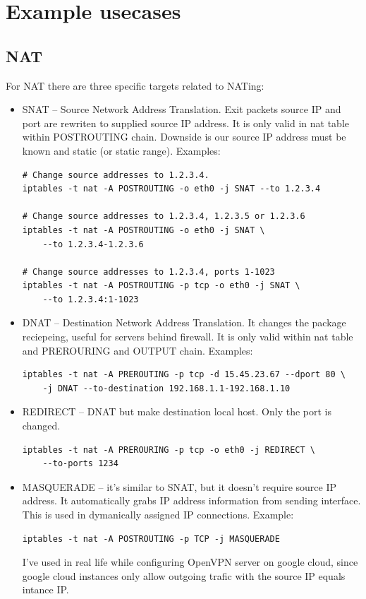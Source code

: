 \documentclass[times, utf8, seminar, english]{fer}
\begin{document}
\chapter{Example usecases}

\section{NAT}
\label{sec:NAT}

For NAT there are three specific targets related to NATing:
\begin{itemize}
    \item SNAT -- Source Network Address Translation. Exit packets source IP and port are rewriten to supplied source IP address. It is only valid in nat table within POSTROUTING chain. Downside is our source IP address must be known and static (or static range). Examples:
    \begin{verbatim}
# Change source addresses to 1.2.3.4.
iptables -t nat -A POSTROUTING -o eth0 -j SNAT --to 1.2.3.4

# Change source addresses to 1.2.3.4, 1.2.3.5 or 1.2.3.6
iptables -t nat -A POSTROUTING -o eth0 -j SNAT \
    --to 1.2.3.4-1.2.3.6

# Change source addresses to 1.2.3.4, ports 1-1023
iptables -t nat -A POSTROUTING -p tcp -o eth0 -j SNAT \
    --to 1.2.3.4:1-1023
    \end{verbatim}
    \item DNAT -- Destination Network Address Translation. It changes the package reciepeing, useful for servers behind firewall. It is only valid within nat table and PREROURING and OUTPUT chain. Examples:
    \begin{verbatim}
iptables -t nat -A PREROUTING -p tcp -d 15.45.23.67 --dport 80 \
    -j DNAT --to-destination 192.168.1.1-192.168.1.10
    \end{verbatim}
    \item REDIRECT -- DNAT but make destination local host. Only the port is changed.
    \begin{verbatim}
iptables -t nat -A PREROURING -p tcp -o eth0 -j REDIRECT \
    --to-ports 1234
    \end{verbatim}
    \item MASQUERADE -- it's similar to SNAT, but it doesn't require source IP address. It automatically grabs IP address information from sending interface. This is used in dymanically assigned IP connections. Example:
    \begin{verbatim}
iptables -t nat -A POSTROUTING -p TCP -j MASQUERADE
    \end{verbatim}
    I've used in real life while configuring OpenVPN server on google cloud, since google cloud instances only allow outgoing trafic with the source IP equals intance IP.
\end{itemize}
\end{document}
